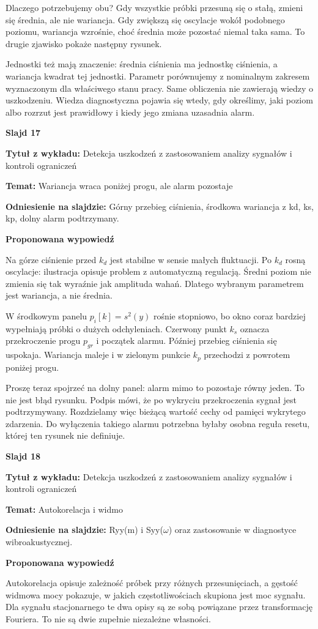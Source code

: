 \documentclass[a4paper,11pt]{article}
\newcommand{\NumerSlajdu}{1}
\newcommand{\Komentarz}[3]{%
  \gdef\NumerSlajdu{#1}%
  {\Large\bfseries Slajd #1\par}\smallskip
  \textbf{Tytuł z wykładu:} #2\par
  \textbf{Temat:} #3\par\medskip
}
\begin{document}
Dlaczego potrzebujemy obu? Gdy wszystkie próbki przesuną się o stałą, zmieni się średnia, ale nie wariancja. Gdy zwiększą się oscylacje wokół podobnego poziomu, wariancja wzrośnie, choć średnia może pozostać niemal taka sama. To drugie zjawisko pokaże następny rysunek.

Jednostki też mają znaczenie: średnia ciśnienia ma jednostkę ciśnienia, a wariancja kwadrat tej jednostki. Parametr porównujemy z nominalnym zakresem wyznaczonym dla właściwego stanu pracy. Same obliczenia nie zawierają wiedzy o uszkodzeniu. Wiedza diagnostyczna pojawia się wtedy, gdy określimy, jaki poziom albo rozrzut jest prawidłowy i kiedy jego zmiana uzasadnia alarm.
\clearpage

\Komentarz{17}{Detekcja uszkodzeń z zastosowaniem analizy sygnałów i kontroli ograniczeń}{Wariancja wraca poniżej progu, ale alarm pozostaje}
{\small\color{black!65}\textbf{Odniesienie na slajdzie:} Górny przebieg ciśnienia, środkowa wariancja z kd, ks, kp, dolny alarm podtrzymany.\par}
\medskip
\textbf{Proponowana wypowiedź}\par
Na górze ciśnienie przed $k_d$ jest stabilne w sensie małych fluktuacji. Po $k_d$ rosną oscylacje: ilustracja opisuje problem z automatyczną regulacją. Średni poziom nie zmienia się tak wyraźnie jak amplituda wahań. Dlatego wybranym parametrem jest wariancja, a nie średnia.

W środkowym panelu $p_i[k]=s^2(y)$ rośnie stopniowo, bo okno coraz bardziej wypełniają próbki o dużych odchyleniach. Czerwony punkt $k_s$ oznacza przekroczenie progu $p_{gr}$ i początek alarmu. Później przebieg ciśnienia się uspokaja. Wariancja maleje i w zielonym punkcie $k_p$ przechodzi z powrotem poniżej progu.

Proszę teraz spojrzeć na dolny panel: alarm mimo to pozostaje równy jeden. To nie jest błąd rysunku. Podpis mówi, że po wykryciu przekroczenia sygnał jest podtrzymywany. Rozdzielamy więc bieżącą wartość cechy od pamięci wykrytego zdarzenia. Do wyłączenia takiego alarmu potrzebna byłaby osobna reguła resetu, której ten rysunek nie definiuje.
\clearpage

\Komentarz{18}{Detekcja uszkodzeń z zastosowaniem analizy sygnałów i kontroli ograniczeń}{Autokorelacja i widmo}
{\small\color{black!65}\textbf{Odniesienie na slajdzie:} Ryy(m) i Syy(\ensuremath{\omega}) oraz zastosowanie w diagnostyce wibroakustycznej.\par}
\medskip
\textbf{Proponowana wypowiedź}\par
Autokorelacja opisuje zależność próbek przy różnych przesunięciach, a gęstość widmowa mocy pokazuje, w jakich częstotliwościach skupiona jest moc sygnału. Dla sygnału stacjonarnego te dwa opisy są ze sobą powiązane przez transformację Fouriera. To nie są dwie zupełnie niezależne własności.
\end{document}
